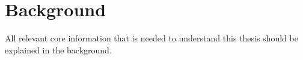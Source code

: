 \chapter{Background}\label{ch:background}

All relevant core information that is needed to understand this thesis should be explained in the background.
